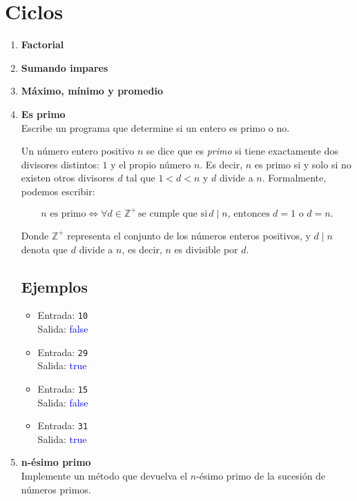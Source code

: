\newpage
\section{Ciclos}
\begin{enumerate}
    \item \textbf{Factorial}\\
    

    \item \textbf{Sumando impares}\\
    

    \item \textbf{Máximo, mínimo y promedio}\\
    

    \item \textbf{Es primo}\\
    Escribe un programa que determine si un entero es primo o no.
    
    Un número entero positivo \( n \) se dice que es \textit{primo} si tiene exactamente dos divisores distintos: \( 1 \) y el propio número \( n \). Es decir, \( n \) es primo si y solo si no existen otros divisores \( d \) tal que \( 1 < d < n \) y \( d \) divide a \( n \). Formalmente, podemos escribir:

    \[
    n \text{ es primo} \iff \forall d \in \mathbb{Z}^+ \, \text{se cumple que si} \, d \mid n \text{, entonces } d = 1 \text{ o } d = n.
    \]
    
    Donde \( \mathbb{Z}^+ \) representa el conjunto de los números enteros positivos, y \( d \mid n \) denota que \( d \) divide a \( n \), es decir, \( n \) es divisible por \( d \).
    \subsection*{Ejemplos}
    \begin{itemize}
        \item Entrada: \texttt{10}\\
              Salida: \textcolor{blue}{false}
        \item Entrada: \texttt{29}\\
              Salida: \textcolor{blue}{true}
        \item Entrada: \texttt{15}\\
              Salida: \textcolor{blue}{false}
        \item Entrada: \texttt{31}\\
              Salida: \textcolor{blue}{true}
    \end{itemize}
    \item \textbf{n-ésimo primo}\\
    Implemente un método que devuelva el $n$-ésimo primo de la sucesión de números primos.

\end{enumerate}
